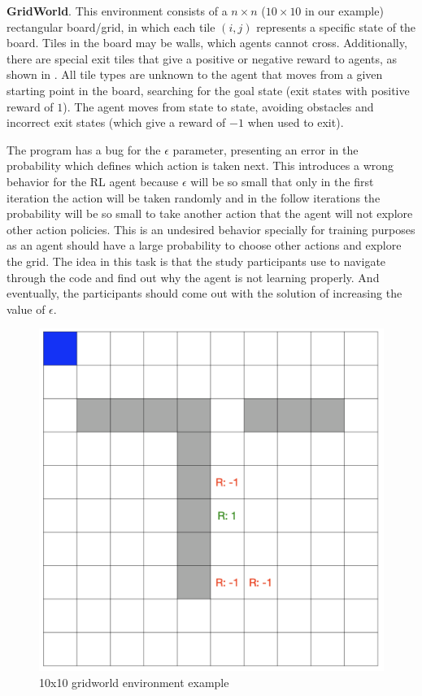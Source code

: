 
\vspace{0.3cm}
\textbf{GridWorld}. This environment consists of a $n \times n$ ($10\times 10$ in our example) rectangular  board/grid, in which each tile $(i,j)$ represents a specific state of the board. Tiles in the board may be  walls, which agents cannot cross. Additionally, there are special exit  tiles that give a positive or negative reward to agents, as shown in . All tile types are unknown to the agent that moves from a given starting point in the board, searching for the goal state (\ie exit states with positive reward of $1$). The agent moves from state to state, avoiding  obstacles and incorrect exit states (which give a reward of $-1$ when used to exit). 

The program has a bug for the $\epsilon$ parameter, presenting an error in the probability which defines which action is taken next. This introduces a wrong behavior for the \ac{RL} 
agent because $\epsilon$ will be so small that only in the first iteration the action will be taken randomly and in the follow iterations the probability will be so small to take another action that the agent will not explore other action policies. This is an undesired behavior specially for training purposes as an agent should have a large probability to choose other actions and explore the grid. The idea in this task is that the study participants use \flik to navigate through the code and find out why the agent is not learning properly. And eventually, the participants should come out with the solution of increasing the value of $\epsilon$. 

\begin{figure}[h]
  \centering
  \includegraphics[width=0.5\columnwidth]{figures/gridworld.png}
  \caption{10x10 gridworld environment example}
  \label{fig:gridworld}
\end{figure}



